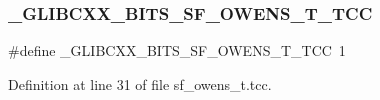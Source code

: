 \subsubsection{\texorpdfstring{\+\_\+\+G\+L\+I\+B\+C\+X\+X\+\_\+\+B\+I\+T\+S\+\_\+\+S\+F\+\_\+\+O\+W\+E\+N\+S\+\_\+\+T\+\_\+\+T\+CC}{\_GLIBCXX\_BITS\_SF\_OWENS\_T\_TCC}}
{\footnotesize\ttfamily \#define \+\_\+\+G\+L\+I\+B\+C\+X\+X\+\_\+\+B\+I\+T\+S\+\_\+\+S\+F\+\_\+\+O\+W\+E\+N\+S\+\_\+\+T\+\_\+\+T\+CC~1}



Definition at line 31 of file sf\+\_\+owens\+\_\+t.\+tcc.

